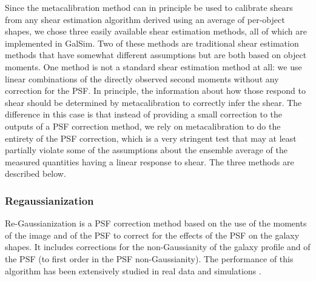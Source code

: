 \documentclass[iop]{emulateapj}
\begin{document}
Since the metacalibration method can in principle be used to calibrate
shears from any shear estimation algorithm derived using an average of per-object shapes, we chose three easily
available shear estimation methods, all of which are implemented in
GalSim.  Two of these methods are traditional shear estimation
methods that have somewhat different assumptions but are both based on
object moments.  One method is not a standard shear estimation method
at all: we use linear combinations of the directly observed second
moments without any correction for the PSF.  In principle, the
information about how those respond to shear should be determined by
metacalibration to correctly infer the shear.  The difference in this
case is that instead of providing a small correction to the outputs of
a PSF correction method, we rely on metacalibration to do the entirety
of the PSF correction, which is a very stringent test that may at least 
partially violate some of the assumptions about the ensemble average of the measured quantities having a linear
response to shear.  The three methods are described below.

\subsubsection{Regaussianization}

Re-Gaussianization \citep{2003MNRAS.343..459H} is a PSF correction
method based on the use of the moments of the image and of the PSF to
correct for the effects of the PSF on the galaxy shapes. It includes
corrections for the non-Gaussianity of the galaxy profile
\citep{2002AJ....123..583B,2003MNRAS.343..459H} and of the PSF (to
first order in the PSF non-Gaussianity). The performance of this
algorithm has been extensively studied in real data and simulations
\citep[e.g.,][]{2005MNRAS.361.1287M,2012MNRAS.420.1518M,2013MNRAS.432.1544M,2015MNRAS.450.2963M}. 
\end{document}
